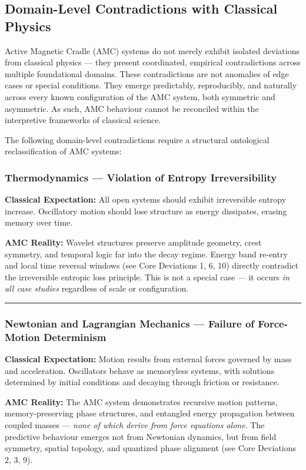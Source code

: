 \documentclass[10pt,aps,pre,onecolumn,superscriptaddress,notitlepage]{revtex4-2}
\begin{document}
\subsection{Domain-Level Contradictions with Classical Physics}
\label{sec:Domain-LevelContradictionswithClassicalPhysics}
Active Magnetic Cradle (AMC) systems do not merely exhibit isolated deviations from classical physics — they present coordinated, empirical contradictions across multiple foundational domains. These contradictions are not anomalies of edge cases or special conditions. They emerge predictably, reproducibly, and naturally across every known configuration of the AMC system, both symmetric and asymmetric. As such, AMC behaviour cannot be reconciled within the interpretive frameworks of classical science.

The following domain-level contradictions require a structural ontological reclassification of AMC systems:

\subsubsection*{Thermodynamics — Violation of Entropy Irreversibility}
\textbf{Classical Expectation:} All open systems should exhibit irreversible entropy increase. Oscillatory motion should lose structure as energy dissipates, erasing memory over time.

\textbf{AMC Reality:} Wavelet structures preserve amplitude geometry, crest symmetry, and temporal logic far into the decay regime. Energy band re-entry and local time reversal windows (see Core Deviations 1, 6, 10) directly contradict the irreversible entropic loss principle. This is not a special case — it occurs \textit{in all case studies} regardless of scale or configuration.

\vspace{1em}
\hrule
\vspace{1em}

\subsubsection*{Newtonian and Lagrangian Mechanics — Failure of Force-Motion Determinism}

\textbf{Classical Expectation:} Motion results from external forces governed by mass and acceleration. Oscillators behave as memoryless systems, with solutions determined by initial conditions and decaying through friction or resistance.

\textbf{AMC Reality:} The AMC system demonstrates recursive motion patterns, memory-preserving phase structures, and entangled energy propagation between coupled masses — \textit{none of which derive from force equations alone}. The predictive behaviour emerges not from Newtonian dynamics, but from field symmetry, spatial topology, and quantized phase alignment (see Core Deviations 2, 3, 9).
\end{document}
